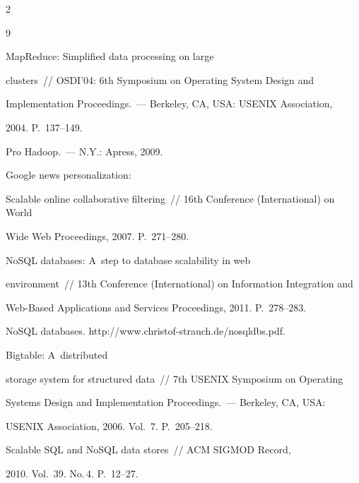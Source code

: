 \begin{multicols}{2}
{{\begin{thebibliography}{9}







 MapReduce: Simplified data processing on large 


clusters~// OSDI'04:  6th Symposium on Operating System Design and 


Implementation Proceedings.~--- Berkeley, CA, USA: USENIX Association, 


2004. P.~137--149.




 Pro Hadoop.~--- N.Y.: Apress, 2009.




 Google news personalization: 


Scalable online collaborative filtering~// 16th Conference (International) on World 


Wide Web Proceedings, 2007. P.~271--280.




 NoSQL databases: A~step to database scalability in web 


environment~//  13th Conference (International) on Information Integration and 


Web-Based Applications and Services Proceedings, 2011. P.~278--283.




 NoSQL databases. {\sf http://www.christof-strauch.de/nosqldbs.pdf}.




 Bigtable: A~distributed 


storage system for structured data~//  7th USENIX Symposium on Operating 


Systems Design and Implementation Proceedings.~--- Berkeley, CA, USA: 


USENIX Association, 2006. Vol.~7. P.~205--218.




 Scalable SQL and NoSQL data stores~// ACM SIGMOD Record, 


2010. Vol.~39. No.\,4. P.~12--27.









\end{thebibliography}}}
\end{multicols}

